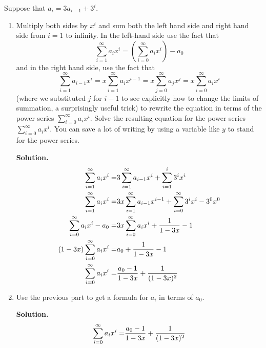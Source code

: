\documentclass{book}
\begin{document}
\setcounter{project}{258}
\addtocounter{project}{-1}
\begin{activity}[]\label{substituteandsolve}
\hypertarget{p-1401}{}%
Suppose that \(a_i=3a_{i-1} + 3^i\).%
\begin{enumerate}[font=\bfseries,label=(\alph*),ref=\alph*]
\item\label{task-247} \hypertarget{p-1402}{}%
Multiply both sides by \(x^i\) and sum both the left hand side and right hand side from \(i=1\) to infinity.  In the left-hand side use the fact that%
\begin{equation*}
\sum_{i=1}^\infty a_ix^i = (\sum_{i=0}^\infty a_ix^i) - a_0
\end{equation*}
and in the right hand side, use the fact that%
\begin{equation*}
\sum_{i=1}^\infty a_{i-1}x^i = x\sum_{i=1}^\infty a_ix^{i-1}
=x\sum_{j=0}^\infty a_jx^j =x\sum_{i=0}^\infty a_ix^i
\end{equation*}
(where we substituted \(j\) for \(i-1\) to see explicitly how to change the limits of summation, a surprisingly useful trick) to rewrite the equation in terms of the power series \(\sum_{i=0}^\infty a_ix^i\).  Solve the resulting equation for the power series \(\sum_{i=0}^\infty a_ix^i\). You can save a lot of writing by using a variable like \(y\) to stand for the power series.%
\par\smallskip%
\noindent\textbf{Solution.}\hypertarget{solution-193}{}\quad%
\hypertarget{p-1403}{}%
%
\begin{align*}
\sum_{i=1}^\infty a_ix^i  =& 3\sum_{i=1}^\infty
a_{i-1}x^i+\sum_{i=1}^i3^ix^i\\
\sum_{i=1}^\infty a_ix^i =& 3x\sum_{i=1}^\infty a_{i-1}x^{i-1}+
\sum_{i=0}^\infty 3^ix^i-3^0x^0\\
\sum_{i=0}^\infty a_ix^i -a_0 =& 3x\sum_{i=0}^\infty a_{i}x^{i}+
\frac{1}{1-3x}-1\\
(1-3x)\sum_{i=0}^\infty a_ix^i  =& a_0+\frac{1}{1-3x} -1\\
\sum_{i=0}^\infty a_ix^i  =& \frac{a_0-1}{1-3x}+\frac{1}{(1-3x)^2}
\end{align*}
%
\item\label{task-248} \hypertarget{p-1404}{}%
Use the previous part to get a formula for \(a_i\) in terms of \(a_0\).%
\par\smallskip%
\noindent\textbf{Solution.}\hypertarget{solution-194}{}\quad%
\hypertarget{p-1405}{}%
%
\begin{align*}
\sum_{i=0}^\infty a_i x^i  =\amp \frac{a_0-1}{1-3x} + \frac{1}{(1-3x)^2}\\

\end{align*}
\end{enumerate}
\end{activity}
\end{document}
